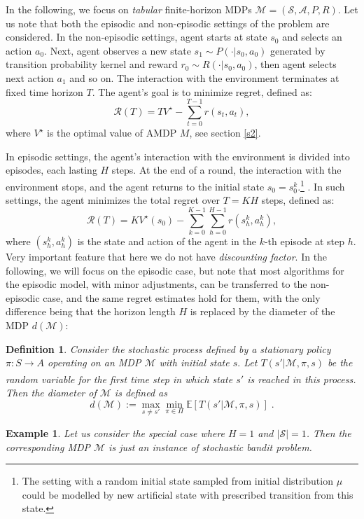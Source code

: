 \documentclass{article}
\numberwithin{equation}{section}
\newtheorem{definition}{Definition}
\newtheorem{example}{Example}
\newcommand{\cA}{\mathcal{A}}
\newcommand{\cM}{\mathcal{M}}
\newcommand{\cS}{\mathcal{S}}
\newcommand{\eqsp}{\;}
\begin{document}
In the following, we focus on \textit{tabular} finite-horizon MDPs $\cM = (\cS, \cA, P, R)$. Let us note that both the episodic and non-episodic settings of the problem are considered. In the non-episodic settings, agent starts at state $s_0$ and selects an action $a_0$. Next, agent observes a new state $s_1 \sim P(\cdot | s_0, a_0)$ generated by transition probability kernel and reward $r_0 \sim R(\cdot | s_0,a_0)$, then agent selects next action $a_1$ and so on. The interaction with the environment terminates at fixed time horizon $T$. The agent's goal is to minimize regret, defined as:
\[\mathcal{R}(T) = TV^{\star} - \sum_{t=0}^{T-1}r(s_t,a_t),\]
where \( V^{\star} \) is the optimal value of AMDP \( M \), see section \ref{s2}.

In episodic settings, the agent's interaction with the environment is divided into episodes, each lasting \( H \) steps. At the end of a round, the interaction with the environment stops, and the agent returns to the initial state $s_0 = s_0^k$.\footnote{The setting with a random initial state sampled from initial distribution $\mu$ could be modelled by new artificial state with prescribed transition from this state.} . In such settings, the agent minimizes the total regret over \( T = K H \) steps, defined as:
\[\mathcal{R}(T) = KV^{\star}(s_0) - \sum_{k=0}^{K-1}\sum_{h=0}^{H-1}r(s_h^k, a_h^k),\]
where \( (s_h^k, a_h^k) \) is the state and action of the agent in the \( k \)-th episode at step \( h \). Very important feature that here we do not have \textit{discounting factor}. In the following, we will focus on the episodic case, but note that most algorithms for the episodic model, with minor adjustments, can be transferred to the non-episodic case, and the same regret estimates hold for them, with the only difference being that the horizon length \( H \) is replaced by the diameter of the MDP \( d(\cM) \):
\begin{definition}
    Consider the stochastic process defined by a stationary policy \(\pi: S\xrightarrow[]{} A\) operating on an MDP \(\mathcal{M}\) with initial state \(s.\) Let \(T(s'|\mathcal{M},\pi, s)\) be the random variable for the first time step in which state \(s'\) is reached in this process. Then the diameter of \(\mathcal{M}\) is defined as 
    \[d(\cM) := \max_{s \not = s'}\min_{\pi\in\Pi}\mathbb{E}[T(s'|\cM,\pi, s)]\eqsp. \]
\end{definition}
\begin{example}
    Let us consider the special case where $H=1$ and $\vert \cS \vert = 1$. Then the corresponding MDP $\cM$ is just an instance of \textit{stochastic bandit} problem.
\end{example}
\end{document}
